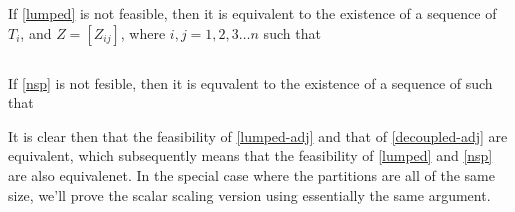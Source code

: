 \documentclass{article}
\begin{document}
If \eqref{lumped} is not feasible, then it is equivalent to the existence of a sequence of $T_i$, and $Z=[Z_{ij}]$, where $i,j=1,2,3 \dots n$ such that 

\begin{equation}\label{lumped-adj}\end{equation}

If \eqref{nsp} is not fesible, then it is equvalent to the existence of a sequence of such that
\begin{equation}\label{decoupled-adj}
\end{equation}

It is clear then that the feasibility of \eqref{lumped-adj} and that of \eqref{decoupled-adj} are equivalent, which subsequently means that the feasibility of \eqref{lumped} and \eqref{nsp} are also equivalenet. 
In the special case where the partitions are all of the same size, we'll prove the scalar scaling version using essentially the same argument. 




\end{document}
